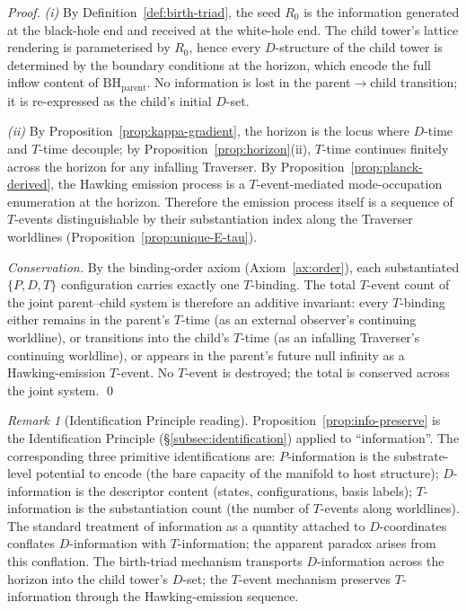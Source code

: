 \documentclass[11pt,a4paper]{article}
\theoremstyle{definition}
\theoremstyle{remark}
\newtheorem{remark}[theorem]{Remark}
\begin{document}
\begin{proof}
\emph{(i)} By Definition~\ref{def:birth-triad}, the seed $R_{0}$ is the information generated at the black-hole end and received at the white-hole end. The child tower's lattice rendering is parameterised by $R_{0}$, hence every $D$-structure of the child tower is determined by the boundary conditions at the horizon, which encode the full inflow content of $\mathrm{BH}_{\text{parent}}$. No information is lost in the parent$\to$child transition; it is re-expressed as the child's initial $D$-set.

\emph{(ii)} By Proposition~\ref{prop:kappa-gradient}, the horizon is the locus where $D$-time and $T$-time decouple; by Proposition~\ref{prop:horizon}(ii), $T$-time continues finitely across the horizon for any infalling Traverser. By Proposition~\ref{prop:planck-derived}, the Hawking emission process is a $T$-event-mediated mode-occupation enumeration at the horizon. Therefore the emission process itself is a sequence of $T$-events distinguishable by their substantiation index along the Traverser worldlines (Proposition~\ref{prop:unique-E-tau}).

\emph{Conservation.} By the binding-order axiom (Axiom~\ref{ax:order}), each substantiated $\{P,D,T\}$ configuration carries exactly one $T$-binding. The total $T$-event count of the joint parent--child system is therefore an additive invariant: every $T$-binding either remains in the parent's $T$-time (as an external observer's continuing worldline), or transitions into the child's $T$-time (as an infalling Traverser's continuing worldline), or appears in the parent's future null infinity as a Hawking-emission $T$-event. No $T$-event is destroyed; the total is conserved across the joint system. \qed
\end{proof}

\begin{remark}[Identification Principle reading]\label{rem:info-identification}
Proposition~\ref{prop:info-preserve} is the Identification Principle (\S\ref{subsec:identification}) applied to ``information''. The corresponding three primitive identifications are: $P$-information is the substrate-level potential to encode (the bare capacity of the manifold to host structure); $D$-information is the descriptor content (states, configurations, basis labels); $T$-information is the substantiation count (the number of $T$-events along worldlines). The standard treatment of information as a quantity attached to $D$-coordinates conflates $D$-information with $T$-information; the apparent paradox arises from this conflation. The birth-triad mechanism transports $D$-information across the horizon into the child tower's $D$-set; the $T$-event mechanism preserves $T$-information through the Hawking-emission sequence.
\end{remark}
\end{document}
